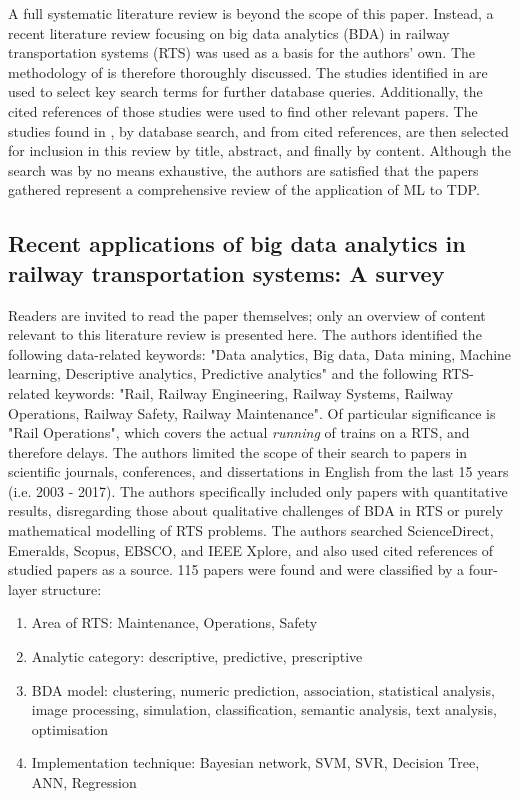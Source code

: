 \documentclass{article}
\begin{document}
A full systematic literature review is beyond the scope of this paper. 
Instead, a recent literature review focusing on big data analytics (BDA) in railway transportation systems (RTS) \cite{ghofrani_et_al_2018} was used as a basis for the authors' own.
The methodology of \cite{ghofrani_et_al_2018} is therefore thoroughly discussed. 
The studies identified in \cite{ghofrani_et_al_2018} are used to select key search terms for further database queries. Additionally, the cited references of those studies were used to find other relevant papers.
The studies found in \cite{ghofrani_et_al_2018}, by database search, and from cited references, are then selected for inclusion in this review by title, abstract, and finally by content.
Although the search was by no means exhaustive, the authors are satisfied that the papers gathered represent a comprehensive review of the application of ML to TDP.

\subsection{Recent applications of big data analytics in railway transportation systems: A survey \cite{ghofrani_et_al_2018}}

Readers are invited to read the paper themselves; only an overview of content relevant to this literature review is presented here.
The authors identified the following data-related keywords: "Data analytics, Big data, Data mining, Machine learning, Descriptive analytics, Predictive analytics" and the following RTS-related keywords: "Rail, Railway Engineering, Railway Systems, Railway Operations, Railway Safety, Railway Maintenance". Of particular significance is "Rail Operations", which covers the actual \textit{running} of trains on a RTS, and therefore delays.
The authors limited the scope of their search to papers in scientific journals, conferences, and dissertations in English from the last 15 years (i.e. 2003 - 2017). 
The authors specifically included only papers with quantitative results, disregarding those about qualitative challenges of BDA in RTS or purely mathematical modelling of RTS problems.
The authors searched ScienceDirect, Emeralds, Scopus, EBSCO, and IEEE Xplore, and also used cited references of studied papers as a source. 
115 papers were found and were classified by a four-layer structure:

\begin{enumerate}
	\item Area of RTS: Maintenance, Operations, Safety
	\item Analytic category: descriptive, predictive, prescriptive
	\item BDA model: clustering, numeric prediction, association, statistical analysis, image processing, simulation, classification, semantic analysis, text analysis, optimisation
	\item Implementation technique: Bayesian network, SVM, SVR, Decision Tree, ANN, Regression
\end{enumerate}
\end{document}
